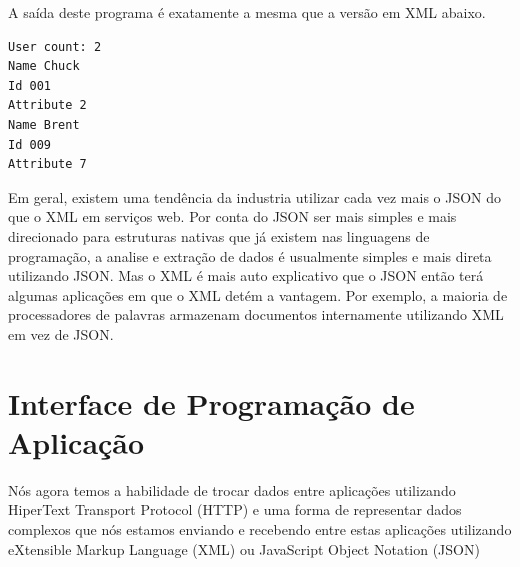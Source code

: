 A saída deste programa é exatamente a mesma que a versão em XML abaixo.

\beforeverb
\begin{verbatim}
User count: 2
Name Chuck
Id 001
Attribute 2
Name Brent
Id 009
Attribute 7
\end{verbatim}
\afterverb
%
Em geral, existem uma tendência da industria utilizar cada vez mais o JSON
do que o XML em serviços web. Por conta do JSON ser mais simples e mais
direcionado para estruturas nativas que já existem nas linguagens de
programação, a analise e extração de dados é usualmente simples e mais direta
utilizando JSON. Mas o XML é mais auto explicativo que o JSON então terá
algumas aplicações em que o XML detém a vantagem. Por exemplo, a maioria de 
processadores de palavras armazenam documentos internamente utilizando XML
em vez de JSON.

\section{Interface de Programação de Aplicação}

Nós agora temos a habilidade de trocar dados entre aplicações utilizando 
HiperText Transport Protocol (HTTP) e uma forma de representar dados complexos
que nós estamos enviando e recebendo entre estas aplicações utilizando 
eXtensible Markup Language (XML) ou JavaScript Object Notation (JSON)


